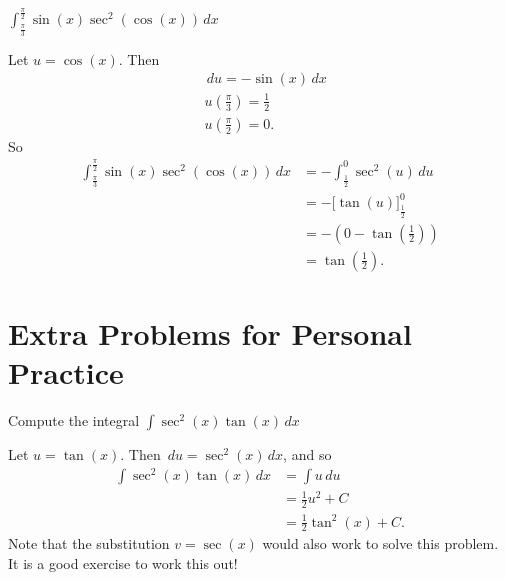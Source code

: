 \documentclass[nooutcomes]{ximera}
\renewenvironment{freeResponse}{
\ifhandout\setbox0\vbox\bgroup\else
\begin{trivlist}\item[\hskip \labelsep\bfseries Solution:\hspace{2ex}]
\fi}
{\ifhandout\egroup\else
\end{trivlist}
\fi}
\renewcommand{\d}{\,d}
\newcommand{\eval}[1]{\bigg[ #1 \bigg]}
\begin{document}
\begin{problem}
\begin{enumerate}
	\item  $\int_{\frac{\pi}{3}}^{\frac{\pi}{2}} \sin(x) \sec^2(\cos(x)) \d x$
		\begin{freeResponse}
		Let $u=\cos(x)$.  Then
			\begin{align*}
			&\d u = -\sin(x) \d x  \\
			&u\left( \frac{\pi}{3} \right) = \frac{1}{2}  \\
			&u\left( \frac{\pi}{2} \right) = 0.
			\end{align*}
		So
			\begin{align*}
			\int_{\frac{\pi}{3}}^{\frac{\pi}{2}} \sin(x) \sec^2(\cos(x)) \d x &= - \int_{\frac{1}{2}}^0 \sec^2(u) \d u   \\
			&= - \eval{\tan(u)}_{\frac{1}{2}}^0  \\
			&=  -\left( 0 - \tan\left( \frac{1}{2} \right) \right)  \\
			&= \tan \left( \frac{1}{2} \right).
			\end{align*}
		\end{freeResponse}
	\end{enumerate}
\end{problem}

\section{Extra Problems for Personal Practice}
\begin{problem}
Compute the integral $\int \sec^2(x) \tan(x) \d x$
	\begin{freeResponse}
		Let $u = \tan(x)$.  Then $\d u = \sec^2 (x) \d x$, and so
		\begin{align*}
			\int \sec^2(x) \tan(x) \d x &= \int u \d u  \\
			&= \frac{1}{2} u^2 + C  \\
			&= \frac{1}{2} \tan^2(x) + C.
		\end{align*}
	   Note that the substitution $v=\sec(x)$ would also work to solve this problem.
		It is a good exercise to work this out!
	\end{freeResponse}
\end{problem}
\end{document}
